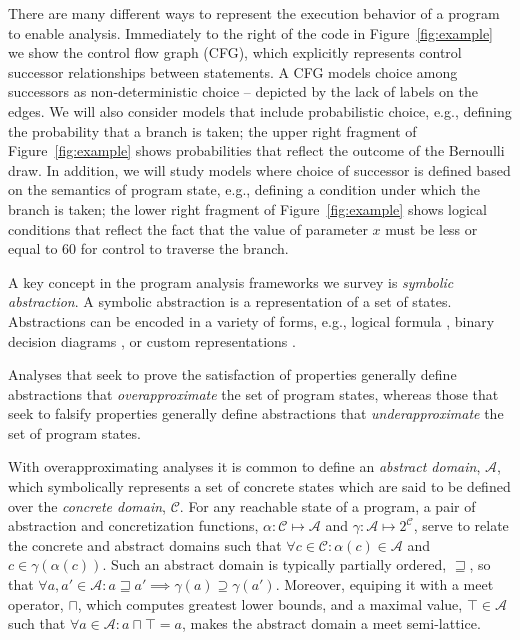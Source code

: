 There are many different ways to represent the execution behavior
of a program to enable analysis.  Immediately to the right of
the code in Figure~\ref{fig:example} we show the control flow graph (CFG),
which explicitly represents control successor relationships between
statements.  A CFG models choice among successors as non-deterministic
choice -- depicted by the lack of labels on the edges.
We will also consider models that include probabilistic choice,
e.g., defining the probability that a branch is taken; the
upper right fragment of Figure~\ref{fig:example} shows probabilities
that reflect the outcome of the Bernoulli draw.
In addition, we will study models where 
choice of successor is defined based on the semantics
of program state, e.g., defining a condition under which the branch
is taken; the lower right fragment of Figure~\ref{fig:example}
shows logical conditions that 
reflect the fact that the value of parameter $x$ must be
less or equal to $60$ for control to traverse the branch.

A key concept in the program analysis frameworks we survey is
\textit{symbolic abstraction}.  A symbolic abstraction is a 
representation of a set of states.  Abstractions can be encoded
in a variety of forms, e.g., logical formula \cite{thakur2012bilateral}, binary
decision diagrams \cite{bryant1992symbolic}, or custom representations \cite{bagnara2008parma}.

Analyses that seek to prove the satisfaction of properties generally
define abstractions that \textit{overapproximate} the set of program
states, whereas those that seek to falsify properties generally define
abstractions that \textit{underapproximate} the set of program states.

With overapproximating analyses it is common to define an \textit{abstract
domain}, $\mathcal{A}$, 
which symbolically represents a set of concrete states which 
are said to be defined over the \textit{concrete domain}, $\mathcal{C}$.
For any reachable state of a program, a pair of abstraction 
and concretization functions, 
$\alpha : \mathcal{C} \mapsto \mathcal{A}$ and  
$\gamma : \mathcal{A} \mapsto 2^\mathcal{C}$,
serve to relate the concrete and abstract domains such that 
$\forall c \in \mathcal{C} : \alpha(c) \in \mathcal{A}$ and $c \in \gamma(\alpha(c))$.
Such an abstract domain is typically partially ordered, $\sqsupseteq$,
so that 
$\forall a,a' \in \mathcal{A} :  a \sqsupseteq a' \implies \gamma(a) \supseteq \gamma(a')$.
Moreover, equiping it with a meet operator, $\sqcap$, which
computes greatest lower bounds, and a maximal
value, $\top \in \mathcal{A}$ such that 
$\forall a \in \mathcal{A} : a \sqcap \top = a$, makes the
abstract domain a meet semi-lattice.

